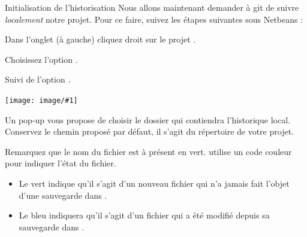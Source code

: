 \documentclass[a4paper,11pt]{style-esi/td}
\newcommand{\image}[2]{{\par\centering \texttt{[image: image/\#1]}\par}
}
\begin{document}
\begin{Tutoriel}{Initialisation de l'historisation}
	Nous allons maintenant demander à git de suivre \emph{localement} notre projet.
	Pour ce faire, suivez les étapes suivantes sous Netbeans :
	\begin{steps}
	\item
		Dans l'onglet  (à gauche) 
		cliquez droit sur le projet .
	\item 
		Choisissez l'option .
	\item 
		Suivi de l'option .
		\image{NetBeans_Push01}{6cm}
	\item 
		Un pop-up vous propose de choisir le dossier 
		qui contiendra l'historique local.
		Conservez le chemin proposé par défaut, 
		il s'agit du répertoire de votre projet.
	\end{steps}
\end{Tutoriel}

Remarquez que le nom du fichier 
est à présent en vert.
 utilise un code couleur pour indiquer l'état du fichier.
\begin{itemize}
\item 
	Le {\color{darkgreen} vert}
	indique qu'il s'agit d'un nouveau fichier qui n'a jamais 
	fait l'objet d'une sauvegarde dans .
\item 
	Le {\color{blue} bleu}
	indiquera qu'il s'agit d'un fichier qui a été modifié
	depuis sa sauvegarde dans .
\end{itemize}
\end{document}
